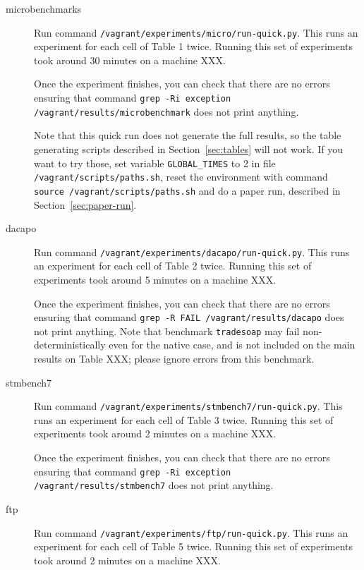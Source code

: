 \documentclass[12pt]{article}
\begin{document}
\begin{description}

    \item[microbenchmarks] Run command
        \texttt{/vagrant/experiments/micro/run-quick.py}.  This runs an
        experiment for each cell of Table 1 twice.  Running this set of
        experiments took around 30 minutes on a machine XXX.

        Once the experiment finishes, you can check that there are no errors
        ensuring that command \texttt{grep -Ri exception /vagrant/results/microbenchmark}
        does not print anything.

        Note that this quick run does not generate the full results, so the
        table generating scripts described in Section~\ref{sec:tables} will not
        work.  If you want to try those, set variable \texttt{GLOBAL\_TIMES} to
        2 in file \texttt{/vagrant/scripts/paths.sh}, reset the environment with
        command \texttt{source /vagrant/scripts/paths.sh} and do a paper run,
        described in Section~\ref{sec:paper-run}.

    \item[dacapo] Run command \texttt{/vagrant/experiments/dacapo/run-quick.py}.
        This runs an experiment for each cell of Table 2 twice.  Running this
        set of experiments took around 5 minutes on a machine XXX.

        Once the experiment finishes, you can check that there are no errors
        ensuring that command \texttt{grep -R FAIL /vagrant/results/dacapo} does not
        print anything.  Note that benchmark \texttt{tradesoap} may fail
        non-deterministically even for the native case, and is not included on
        the main results on Table XXX; please ignore errors from this benchmark.

    \item[stmbench7] Run command
        \texttt{/vagrant/experiments/stmbench7/run-quick.py}.  This runs an
        experiment for each cell of Table 3 twice.  Running this set of
        experiments took around 2 minutes on a machine XXX.

        Once the experiment finishes, you can check that there are no errors
        ensuring that command \texttt{grep -Ri exception /vagrant/results/stmbench7}
        does not print anything.

    \item[ftp] Run command
        \texttt{/vagrant/experiments/ftp/run-quick.py}.  This runs an
        experiment for each cell of Table 5 twice.  Running this set of
        experiments took around 2 minutes on a machine XXX.


\end{description}
\end{document}
